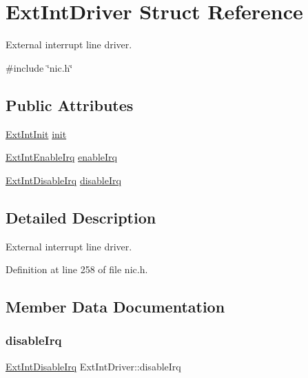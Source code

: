 \hypertarget{structExtIntDriver}{}\section{Ext\+Int\+Driver Struct Reference}
\label{structExtIntDriver}


External interrupt line driver.  




{\ttfamily \#include \char`\"{}nic.\+h\char`\"{}}

\subsection*{Public Attributes}
\begin{DoxyCompactItemize}
\item 
\hyperlink{nic_8h_a0fb3a794e644738e423bbcf3fc09047b}{Ext\+Int\+Init} \hyperlink{structExtIntDriver_a25a77659646a73f8f4f46db4acde5931}{init}
\item 
\hyperlink{nic_8h_a7718a8a56f19fcb851736f1810e2efce}{Ext\+Int\+Enable\+Irq} \hyperlink{structExtIntDriver_a32c52bdf0311e63967fb7b5eb8dc6c3c}{enable\+Irq}
\item 
\hyperlink{nic_8h_a03d360f5fa3eb3c27e63a9247d8f7e1d}{Ext\+Int\+Disable\+Irq} \hyperlink{structExtIntDriver_a33957a62c7c2e91ff014f8da44ac30ac}{disable\+Irq}
\end{DoxyCompactItemize}


\subsection{Detailed Description}
External interrupt line driver. 

Definition at line 258 of file nic.\+h.



\subsection{Member Data Documentation}
\mbox{\label{structExtIntDriver_a33957a62c7c2e91ff014f8da44ac30ac}} 
\subsubsection{\texorpdfstring{disable\+Irq}{disableIrq}}
{\footnotesize\ttfamily \hyperlink{nic_8h_a03d360f5fa3eb3c27e63a9247d8f7e1d}{Ext\+Int\+Disable\+Irq} Ext\+Int\+Driver\+::disable\+Irq}



